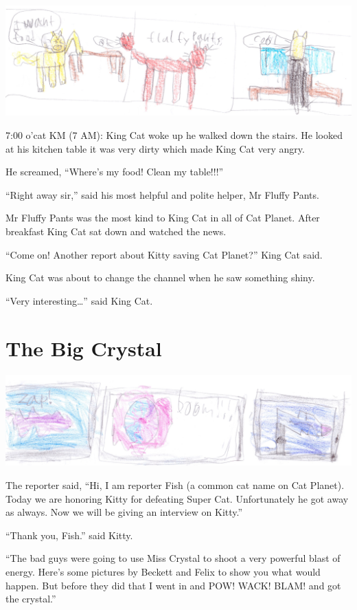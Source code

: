 \documentclass[12pt,oneside]{krantz}
\begin{document}
\includegraphics{img/fluffypants.jpg}

7:00 o'cat KM (7 AM): King Cat woke up he walked down the stairs. He
looked at his kitchen table it was very dirty which made King Cat very
angry.

He screamed, ``Where's my food! Clean my table!!!''

``Right away sir,'' said his most helpful and polite helper, Mr Fluffy
Pants.

Mr Fluffy Pants was the most kind to King Cat in all of Cat Planet.
After breakfast King Cat sat down and watched the news.

``Come on! Another report about Kitty saving Cat Planet?'' King Cat
said.

King Cat was about to change the channel when he saw something shiny.

``Very interesting\ldots{}'' said King Cat.

\hypertarget{the-big-crystal}{%
\chapter{The Big Crystal}\label{the-big-crystal}}

\includegraphics{img/boom.jpg}

The reporter said, ``Hi, I am reporter Fish (a common cat name on Cat
Planet). Today we are honoring Kitty for defeating Super Cat.
Unfortunately he got away as always. Now we will be giving an interview
on Kitty.''

``Thank you, Fish.'' said Kitty.

``The bad guys were going to use Miss Crystal to shoot a very powerful
blast of energy. Here's some pictures by Beckett and Felix to show you
what would happen. But before they did that I went in and POW! WACK!
BLAM! and got the crystal.''
\end{document}
